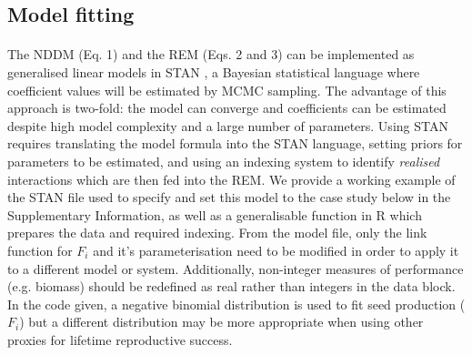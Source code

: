 \documentclass[a4,12pt]{article}
\begin{document}


    \subsection{Model fitting}

        \paragraph{}        
        The NDDM (Eq. 1) and the REM (Eqs. 2 and 3) can be implemented as generalised linear models in STAN \parencite{Carpenter2017}, a Bayesian statistical language where coefficient values will be estimated by MCMC sampling. The advantage of this approach is two-fold: the model can converge and coefficients can be estimated despite high model complexity and a large number of parameters. Using STAN requires translating the model formula into the STAN language, setting priors for parameters to be estimated, and using an indexing system to identify \textit{realised} interactions which are then fed into the REM. We provide a working example of the STAN file used to specify and set this model to the case study below in the Supplementary Information, as well as a generalisable function in R which prepares the data and required indexing. From the model file, only the link function for $F_i$ and it's parameterisation need to be modified in order to apply it to a different model or system. Additionally, non-integer measures of performance (e.g. biomass) should be redefined as real rather than integers in the data block. In the code given, a negative binomial distribution is used to fit seed production ($F_i$) but a different distribution may be more appropriate when using other proxies for lifetime reproductive success.   
\end{document}

